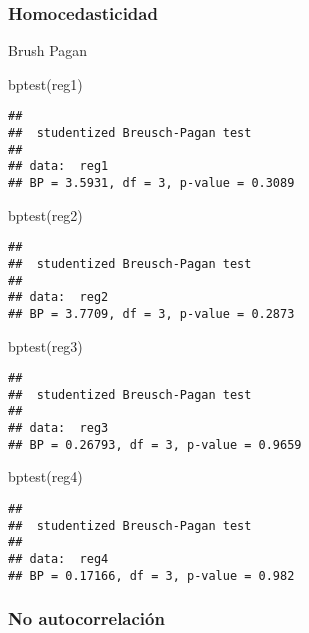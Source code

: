\documentclass[
]{article}
\newenvironment{Shaded}{\begin{snugshade}}{\end{snugshade}}
\newcommand{\FunctionTok}[1]{\textcolor[rgb]{0.00,0.00,0.00}{#1}}
\newcommand{\NormalTok}[1]{#1}
\begin{document}
\hypertarget{homocedasticidad}{%
\subsubsection{Homocedasticidad}\label{homocedasticidad}}

Brush Pagan

\begin{Shaded}
\begin{Highlighting}[]
\FunctionTok{bptest}\NormalTok{(reg1)}
\end{Highlighting}
\end{Shaded}

\begin{verbatim}
## 
##  studentized Breusch-Pagan test
## 
## data:  reg1
## BP = 3.5931, df = 3, p-value = 0.3089
\end{verbatim}

\begin{Shaded}
\begin{Highlighting}[]
\FunctionTok{bptest}\NormalTok{(reg2)}
\end{Highlighting}
\end{Shaded}

\begin{verbatim}
## 
##  studentized Breusch-Pagan test
## 
## data:  reg2
## BP = 3.7709, df = 3, p-value = 0.2873
\end{verbatim}

\begin{Shaded}
\begin{Highlighting}[]
\FunctionTok{bptest}\NormalTok{(reg3)}
\end{Highlighting}
\end{Shaded}

\begin{verbatim}
## 
##  studentized Breusch-Pagan test
## 
## data:  reg3
## BP = 0.26793, df = 3, p-value = 0.9659
\end{verbatim}

\begin{Shaded}
\begin{Highlighting}[]
\FunctionTok{bptest}\NormalTok{(reg4)}
\end{Highlighting}
\end{Shaded}

\begin{verbatim}
## 
##  studentized Breusch-Pagan test
## 
## data:  reg4
## BP = 0.17166, df = 3, p-value = 0.982
\end{verbatim}

\hypertarget{no-autocorrelaciuxf3n}{%
\subsubsection{No autocorrelación}\label{no-autocorrelaciuxf3n}}
\end{document}
